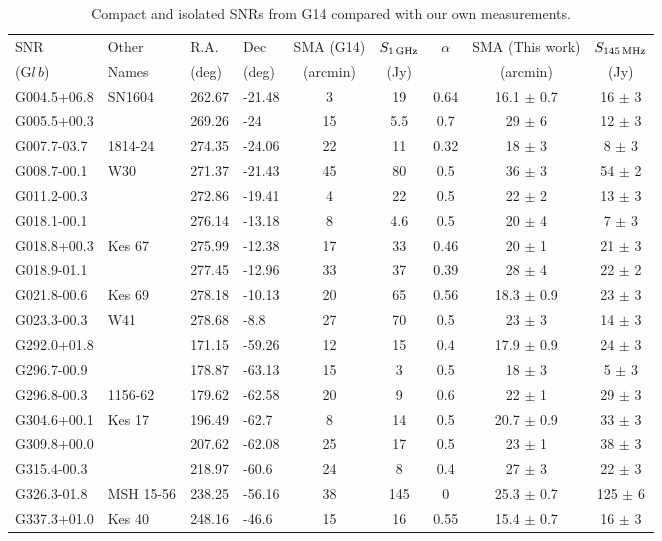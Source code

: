 \documentclass[useAMS,usenatbib]{mn2e}
\begin{document}
\begin{table}
\caption{Compact and isolated SNRs from G14 compared with our own measurements.}
\begin{tabular}{llllccccc}
\hline
SNR	&	Other	&	R.A.	&	Dec	&	SMA (G14)	&	$S_{1\,{\rm GHz}}$ &	$\alpha$ 	&	SMA  (This work)			&	$S_{145\,{\rm MHz}}$			\\
(G$l\,b$)	&	Names	&	(deg)	&	(deg)	&	(arcmin)	&	(Jy)	&		&	(arcmin)			&	(Jy)			\\
\hline																					
G004.5+06.8	&	SN1604	&	262.67	&	-21.48	&	3	&	19	&	0.64	&	16.1	$\pm$	0.7	&	16	$\pm$	3	\\
G005.5+00.3	&		&	269.26	&	-24	&	15	&	5.5	&	0.7	&	29	$\pm$	6	&	12	$\pm$	3	\\
G007.7-03.7	&	1814-24	&	274.35	&	-24.06	&	22	&	11	&	0.32	&	18	$\pm$	3	&	8	$\pm$	3	\\
G008.7-00.1	&	W30	&	271.37	&	-21.43	&	45	&	80	&	0.5	&	36	$\pm$	3	&	54	$\pm$	2	\\
G011.2-00.3	&		&	272.86	&	-19.41	&	4	&	22	&	0.5	&	22	$\pm$	2	&	13	$\pm$	3	\\
G018.1-00.1	&		&	276.14	&	-13.18	&	8	&	4.6	&	0.5	&	20	$\pm$	4	&	7	$\pm$	3	\\
G018.8+00.3	&	Kes 67	&	275.99	&	-12.38	&	17	&	33	&	0.46	&	20	$\pm$	1	&	21	$\pm$	3	\\
G018.9-01.1	&		&	277.45	&	-12.96	&	33	&	37	&	0.39	&	28	$\pm$	4	&	22	$\pm$	2	\\
G021.8-00.6	&	Kes 69	&	278.18	&	-10.13	&	20	&	65	&	0.56	&	18.3	$\pm$	0.9	&	23	$\pm$	3	\\
G023.3-00.3	&	W41	&	278.68	&	-8.8	&	27	&	70	&	0.5	&	23	$\pm$	3	&	14	$\pm$	3	\\
G292.0+01.8	&		&	171.15	&	-59.26	&	12	&	15	&	0.4	&	17.9	$\pm$	0.9	&	24	$\pm$	3	\\
G296.7-00.9	&		&	178.87	&	-63.13	&	15	&	3	&	0.5	&	18	$\pm$	3	&	5	$\pm$	3	\\
G296.8-00.3	&	1156-62	&	179.62	&	-62.58	&	20	&	9	&	0.6	&	22	$\pm$	1	&	29	$\pm$	3	\\
G304.6+00.1	&	Kes 17	&	196.49	&	-62.7	&	8	&	14	&	0.5	&	20.7	$\pm$	0.9	&	33	$\pm$	3	\\
G309.8+00.0	&		&	207.62	&	-62.08	&	25	&	17	&	0.5	&	23	$\pm$	1	&	38	$\pm$	3	\\
G315.4-00.3	&		&	218.97	&	-60.6	&	24	&	8	&	0.4	&	27	$\pm$	3	&	22	$\pm$	3	\\
G326.3-01.8	&	MSH 15-56	&	238.25	&	-56.16	&	38	&	145	&	0	&	25.3	$\pm$	0.7	&	125	$\pm$	6	\\
G337.3+01.0	&	Kes 40	&	248.16	&	-46.6	&	15	&	16	&	0.55	&	15.4	$\pm$	0.7	&	16	$\pm$	3	\\

\end{tabular}
\end{table}
\end{document}
